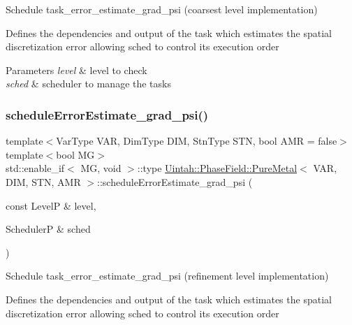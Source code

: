 Schedule task\+\_\+error\+\_\+estimate\+\_\+grad\+\_\+psi (coarsest level implementation) 

Defines the dependencies and output of the task which estimates the spatial discretization error allowing sched to control its execution order


\begin{DoxyParams}{Parameters}
{\em level} & level to check \\
\hline
{\em sched} & scheduler to manage the tasks \\
\hline
\end{DoxyParams}
\mbox{\label{classUintah_1_1PhaseField_1_1PureMetal_a77fe2fdf1de3522b5eae6e25bde0f78c}} 
\subsubsection{\texorpdfstring{schedule\+Error\+Estimate\+\_\+grad\+\_\+psi()}{scheduleErrorEstimate\_grad\_psi()}\hspace{0.1cm}{\footnotesize\ttfamily [2/2]}}
{\footnotesize\ttfamily template$<$Var\+Type V\+AR, Dim\+Type D\+IM, Stn\+Type S\+TN, bool A\+MR = false$>$ \\
template$<$bool MG$>$ \\
std\+::enable\+\_\+if$<$ MG, void $>$\+::type \hyperlink{classUintah_1_1PhaseField_1_1PureMetal}{Uintah\+::\+Phase\+Field\+::\+Pure\+Metal}$<$ V\+AR, D\+IM, S\+TN, A\+MR $>$\+::schedule\+Error\+Estimate\+\_\+grad\+\_\+psi (\begin{DoxyParamCaption}\item[{const LevelP \&}]{level,  }\item[{SchedulerP \&}]{sched }\end{DoxyParamCaption})\hspace{0.3cm}{\ttfamily [protected]}}



Schedule task\+\_\+error\+\_\+estimate\+\_\+grad\+\_\+psi (refinement level implementation) 

Defines the dependencies and output of the task which estimates the spatial discretization error allowing sched to control its execution order


